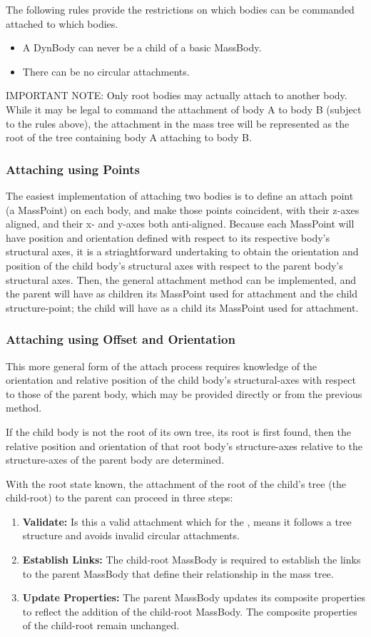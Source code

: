 The following rules provide the restrictions on which bodies can be commanded
attached to which bodies.
\begin{itemize}
 \item A DynBody can never be a child of a basic
 MassBody.
 \item There can be no circular attachments.
\end{itemize}
IMPORTANT NOTE: Only root bodies may actually attach to another body.  While
it may be legal to command the attachment of body A to body B (subject to the
rules above), the attachment in the mass tree will be represented as the root
of the tree containing body A attaching to body B.

\subsubsection{Attaching using Points}
The easiest implementation of attaching two bodies is to define an attach
point (a MassPoint) on each body, and make those points coincident, with their
z-axes aligned, and their x- and y-axes both anti-aligned.  Because each
MassPoint will have position and orientation defined with respect to its
respective body's structural axes, it is a striaghtforward undertaking to
obtain the orientation and position of the child body's structural axes with
respect to the parent body's structural axes.  Then, the general attachment
method can be implemented, and the parent will have as children its MassPoint
used for attachment and the child structure-point; the child will have as a
child its MassPoint used for attachment.

\subsubsection{Attaching using Offset and Orientation}
This more general form of the attach process requires knowledge of the
orientation and relative position of the child body's structural-axes with
respect to those of the parent body, which may be provided directly or from
the previous method.

If the child body is not the root of its own tree, its root is first found,
then the relative position and orientation of that root body's structure-axes
relative to the structure-axes of the parent body are determined.

With the root state known, the attachment of the root of the child's tree (the
child-root) to the parent can proceed in three steps:
\begin{enumerate}
\item{\bf Validate:} Is this a valid attachment which for the \ModelDesc,
means it follows a tree structure and avoids
invalid circular attachments.
\item{\bf Establish Links:} The child-root MassBody is required to establish
the links to the parent MassBody that define their
relationship in the mass tree.
\item{\bf Update Properties:}  The parent MassBody updates its composite
properties to reflect the addition of the child-root MassBody.
The composite properties of the child-root remain unchanged.
\end{enumerate}

